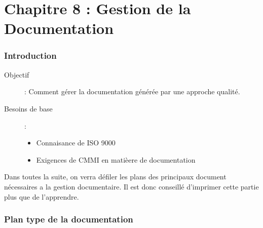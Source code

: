 \part{Chapitre 8 : Gestion de la Documentation}

\section{Introduction}

\begin{description}
\item[Objectif] : Comment gérer la documentation générée par une approche qualité.
\item[Besoins de base] :
	\begin{itemize}
	\item Connaisance de ISO 9000
	\item Exigences de CMMI en matièere de documentation
	\end{itemize}
\end{description}

Dans toutes la suite, on verra défiler les plans des principaux document nécessaires a la gestion documentaire. Il est donc conseillé d’imprimer cette partie plus que de l’apprendre.

\section{Plan type de la documentation}

